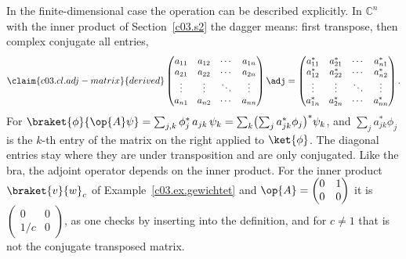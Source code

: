 In the finite-dimensional case the operation can be described explicitly. In $\mathbb{C}^n$
with the inner product of Section~\ref{c03.s2} the dagger means: first transpose, then complex
conjugate all entries,
\begin{equation}\label{c03.eq.adj-matrix}\claim{c03.cl.adj-matrix}{derived}
  \begin{pmatrix}
    a_{11} & a_{12} & \cdots & a_{1n} \\
    a_{21} & a_{22} & \cdots & a_{2n} \\
    \vdots & \vdots & \ddots & \vdots \\
    a_{n1} & a_{n2} & \cdots & a_{nn}
  \end{pmatrix}\adj
  =
  \begin{pmatrix}
    a_{11}^* & a_{21}^* & \cdots & a_{n1}^* \\
    a_{12}^* & a_{22}^* & \cdots & a_{n2}^* \\
    \vdots & \vdots & \ddots & \vdots \\
    a_{1n}^* & a_{2n}^* & \cdots & a_{nn}^*
  \end{pmatrix} .
\end{equation}
For
$\braket{\phi}{\op{A}\psi} = \sum_{j,k} \phi_j^*\, a_{jk}\, \psi_k = \sum_k \bigl( \sum_j a_{jk}^* \phi_j \bigr)^* \psi_k$,
and $\sum_j a_{jk}^* \phi_j$ is the $k$-th entry of the matrix on the right applied to
$\ket{\phi}$. The diagonal entries stay where they are under transposition and are only
conjugated. Like the bra, the adjoint operator depends on the inner product. For the inner
product $\braket{v}{w}_c$ of Example~\ref{c03.ex.gewichtet} and
$\op{A} = \begin{pmatrix} 0 & 1 \\ 0 & 0 \end{pmatrix}$ it is
$\begin{pmatrix} 0 & 0 \\ 1/c & 0 \end{pmatrix}$, as one checks by inserting into the
definition, and for $c \neq 1$ that is not the conjugate transposed matrix.

